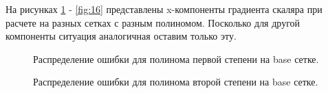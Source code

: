 На рисунках \ref{fig:11} - \ref{fig:16} представлены x-компоненты градиента скаляра при расчете на разных сетках с разным полиномом. Посколько для другой компоненты ситуация аналогичная оставим только эту. 

\begin{figure}[H]
    \centering
    \caption{Распределение ошибки для полинома первой степени на base сетке.}
    \label{fig:11}
\end{figure}

\begin{figure}[H]
    \centering
    \caption{Распределение ошибки для полинома второй степени на base сетке.}
    \label{fig:12}
\end{figure}


